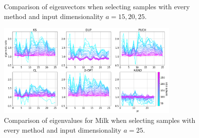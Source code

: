 \documentclass[journal=ancham,manuscript=article]{achemso}
\begin{document}
\begin{figure}[t]
    \centering
    \caption{Comparison of eigenvectors when selecting samples with every method and input dimensionality $a=15,20,25$.}
    \label{fig_specific_framework_detereigevect}
\end{figure}

\begin{figure}[b]
\includegraphics[width=0.8\textwidth]{manuscript/figures/d01_milk_specific_framework_eigenvalsratio.png}
\centering
\caption{Comparison of eigenvalues for Milk when selecting samples with every method and input dimensionality $a=25$.}
\label{fig_d01_milk_specific_framework_eigenvalsratio}
\end{figure}
\end{document}

